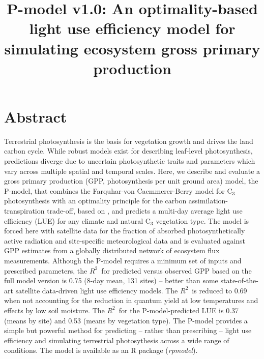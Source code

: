 \documentclass{myreport}
\newcommand{\rsq}{$R^2$}
\begin{document}
\pagestyle{headings}

% 

\title{P-model v1.0: An optimality-based light use efficiency model for simulating ecosystem gross primary production}

\maketitle

\tableofcontents

\section*{Abstract}

Terrestrial photosynthesis is the basis for vegetation growth and drives the land carbon cycle. %
While robust models exist for describing leaf-level photosynthesis, predictions diverge due to uncertain photosynthetic traits and parameters which vary across multiple spatial and temporal scales. Here, we describe and evaluate a gross primary production (GPP, photosynthesis per unit ground area) model, the P-model, that combines the Farquhar-von Caemmerer-Berry model for C$_3$ photosynthesis with an optimality principle for the carbon assimilation-transpiration trade-off, based on \cite{wang17natpl}, and predicts a multi-day average light use efficiency (LUE) for any climate and natural C$_3$ vegetation type. The model is forced here with satellite data for the fraction of absorbed photosynthetically active radiation and site-specific meteorological data and is evaluated against GPP estimates from a globally distributed network of ecosystem flux measurements. Although the P-model requires a minimum set of inputs and prescribed parameters, the \rsq\ for predicted versus observed GPP based on the full model version is 0.75 (8-day mean, 131 sites) -- better than some state-of-the-art satellite data-driven light use efficiency models. The \rsq\ is reduced to 0.69 when not accounting for the reduction in quantum yield at low temperatures and effects by low soil moisture. The \rsq\ for the P-model-predicted LUE is 0.37 (means by site) and 0.53 (means by vegetation type). The P-model provides a simple but powerful method for predicting -- rather than prescribing -- light use efficiency and simulating terrestrial photosythesis across a wide range of conditions. The model is available as an R package (\textit{rpmodel}).
\end{document}
